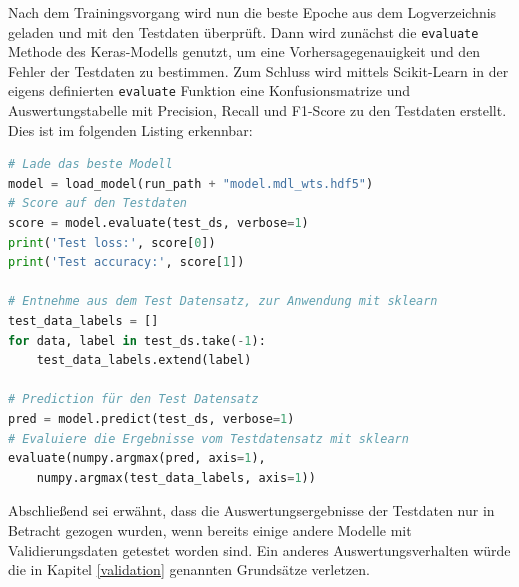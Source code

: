 \documentclass[11pt,bibliography=totocnumbered]{scrartcl}
\begin{document}
Nach dem Trainingsvorgang wird nun die beste Epoche aus dem Logverzeichnis geladen und mit den Testdaten überprüft. Dann wird zunächst die \lstinline[language=pythoninline]|evaluate| Methode des Keras-Modells genutzt, um eine Vorhersagegenauigkeit und den Fehler der Testdaten zu bestimmen. Zum Schluss wird mittels Scikit-Learn in der eigens definierten \lstinline[language=pythoninline]|evaluate| Funktion eine Konfusionsmatrize und Auswertungstabelle mit Precision, Recall und F1-Score zu den Testdaten erstellt. Dies ist im folgenden Listing erkennbar:
\begin{lstlisting}[language=python,firstnumber=1,caption={Auswertung eines Modells mit Testdaten},label=lst:modell_eval]
# Lade das beste Modell
model = load_model(run_path + "model.mdl_wts.hdf5")
# Score auf den Testdaten
score = model.evaluate(test_ds, verbose=1)
print('Test loss:', score[0])
print('Test accuracy:', score[1])

# Entnehme aus dem Test Datensatz, zur Anwendung mit sklearn
test_data_labels = []
for data, label in test_ds.take(-1):
	test_data_labels.extend(label)

# Prediction für den Test Datensatz
pred = model.predict(test_ds, verbose=1)
# Evaluiere die Ergebnisse vom Testdatensatz mit sklearn
evaluate(numpy.argmax(pred, axis=1), 
	numpy.argmax(test_data_labels, axis=1))
\end{lstlisting}
Abschließend sei erwähnt, dass die Auswertungsergebnisse der Testdaten nur in Betracht gezogen wurden, wenn bereits einige andere Modelle mit Validierungsdaten getestet worden sind. Ein anderes Auswertungsverhalten würde die in Kapitel \ref{validation} genannten Grundsätze verletzen.
\end{document}
